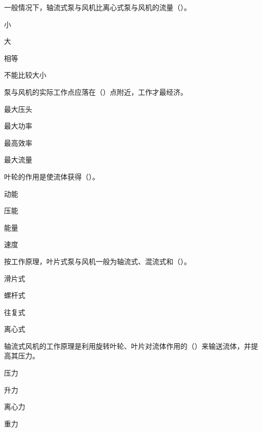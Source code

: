 \begin{ti}
\item 一般情况下，轴流式泵与风机比离心式泵与风机的流量（\quad）。
\begin{choices}
\item 小
\item 大
\item 相等
\item 不能比较大小
\end{choices}

\item 泵与风机的实际工作点应落在（\quad）点附近，工作才最经济。
\begin{choices}
\item 最大压头
\item 最大功率
\item 最高效率
\item 最大流量
\end{choices}

\item 叶轮的作用是使流体获得（\quad）。
\begin{choices}
\item 动能
\item 压能
\item 能量
\item 速度
\end{choices}

\item 按工作原理，叶片式泵与风机一般为轴流式、混流式和（\quad）。
\begin{choices}
\item 滑片式
\item 螺杆式
\item 往复式
\item 离心式
\end{choices}

\item 轴流式风机的工作原理是利用旋转叶轮、叶片对流体作用的（\quad）来输送流体，并提高其压力。
\begin{choices}
\item 压力
\item 升力
\item 离心力
\item 重力
\end{choices}


\end{ti}
